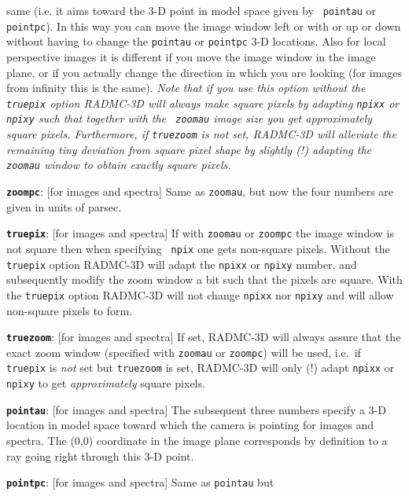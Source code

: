 \documentclass{report}
\newenvironment{options}%
  {\begin{list}{}{%
    \setlength{\topsep}{1em}%
    \setlength{\parskip}{0em}%
    \setlength{\parsep}{0em}%
    \setlength{\itemsep}{1em}%
    \setlength{\rightmargin}{0em}%
    \setlength{\leftmargin}{9em}%
    \setlength{\labelsep}{1em}%
    \setlength{\labelwidth}{6em}%
    \setlength{\itemindent}{0em}}\normalfont}%
  {\end{list}}
\begin{document}
\begin{options}
  same (i.e. it aims toward the 3-D point in model space given by {\small\tt
    pointau} or {\small\tt pointpc}). In this way you can move the image window
  left or with or up or down without having to change the {\small\tt pointau} or
  {\small\tt pointpc} 3-D locations. Also for local perspective images it is
  different if you move the image window in the image plane, or if you
  actually change the direction in which you are looking (for images from
  infinity this is the same). {\em Note that if you use this option without
    the {\small\tt truepix} option RADMC-3D will always make square pixels by
    adapting {\small\tt npixx} or {\small\tt npixy} such that together with the {\small\tt
      zoomau} image size you get approximately square pixels. Furthermore,
    if {\small\tt truezoom} is not set, RADMC-3D will alleviate the remaining tiny
    deviation from square pixel shape by slightly (!) adapting the {\small\tt
      zoomau} window to obtain exactly square pixels.}
\item[{\small\tt\bf zoompc}:\hfill] [for images and spectra] Same as {\small\tt zoomau}, but
  now the four numbers are given in units of parsec.
\item[{\small\tt\bf truepix}:\hfill] [for images and spectra] If with {\small\tt zoomau} or
  {\small\tt zoompc} the image window is not square then when specifying {\small\tt
    npix} one gets non-square pixels. Without the {\small\tt truepix} option
  RADMC-3D will adapt the {\small\tt npixx} or {\small\tt npixy} number, and
  subsequently modify the zoom window a bit such that the pixels are
  square. With the {\small\tt truepix} option RADMC-3D will not change {\small\tt npixx}
  nor {\small\tt npixy} and will allow non-square pixels to form.
\item[{\small\tt\bf truezoom}:\hfill] [for images and spectra] If set, RADMC-3D will always assure
  that the exact zoom window (specified with {\small\tt zoomau} or {\small\tt zoompc}) 
  will be used, i.e.\ if {\small\tt truepix} is {\em not} set but {\small\tt truezoom}
  is set, RADMC-3D will only (!) adapt {\small\tt npixx} or {\small\tt npixy} to get
  {\em approximately} square pixels.
\item[{\small\tt\bf pointau}:\hfill] [for images and spectra] The subsequent three
  numbers specify a 3-D location in model space toward which the camera is
  pointing for images and spectra.  The (0,0) coordinate in the image plane
  corresponds by definition to a ray going right through this 3-D point.
\item[{\small\tt\bf pointpc}:\hfill] [for images and spectra] Same as {\small\tt pointau} but

\end{options}
\end{document}
